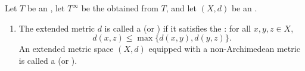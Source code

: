 \begin{definition}\label{definition:archimedean_and_nonarchimedean_metrics_on_sets}
    Let $T$ be an , let $T^\infty$ be the  obtained from $T$, and let $(X, d)$ be an .

    \begin{enumerate}
        \item The extended metric $d$ is called a  (or ) if it satisfies the : for all $x, y, z \in X$,
        $$
            d(x, z) \leq \max\{d(x, y), d(y, z)\}.
        $$
        An extended metric space $(X, d)$ equipped with a non-Archimedean metric is called a  (or ).
    \end{enumerate}

\end{definition}
